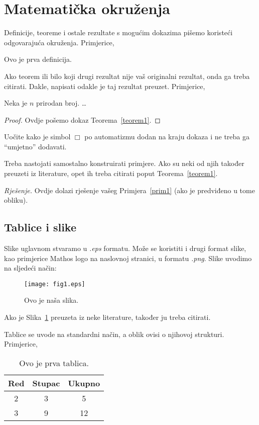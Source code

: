 \documentclass{mathos}
\begin{document}
\section{Matematička okruženja}

Definicije, teoreme i ostale rezultate s mogućim dokazima pišemo koristeći odgovarajuća okruženja. Primjerice,
\begin{defin}
Ovo je prva definicija.
\end{defin}
Ako teorem ili bilo koji drugi rezultat nije vaš originalni rezultat, onda ga treba citirati. Dakle, napisati odakle je taj rezultat preuzet. Primjerice,
\begin{teorem}  \label{teorem1}
Neka je $n$ prirodan broj. \dots
\end{teorem}

\begin{proof}
Ovdje pošemo dokaz Teorema~\ref{teorem1}.
\end{proof}
Uočite kako je simbol $\Box$ po automatizmu dodan na kraju dokaza i ne treba ga ``umjetno'' dodavati.

\begin{primjer}\label{prim1}
Treba nastojati samostalno konstruirati primjere. Ako su neki od njih također preuzeti iz literature, opet ih treba citirati poput Teorema~\ref{teorem1}.
\end{primjer}
\noindent
{\it Rješenje.} Ovdje dolazi rješenje vašeg Primjera~\ref{prim1} (ako je predviđeno u tome obliku).

\subsection{Tablice i slike}

Slike uglavnom stvaramo u {\it .eps} formatu. Može se koristiti i drugi format slike, kao primjerice  Mathos logo na naslovnoj stranici, u formatu {\it .png}. Slike uvodimo na sljedeći način:

\begin{figure}[h!]
\centering
\texttt{[image: fig1.eps]}
\caption{Ovo je naša slika.}
\label{fig1}
\end{figure}

Ako je Slika~\ref{fig1} preuzeta iz neke literature, također ju treba citirati.

\newpage
Tablice se uvode na standardni način, a oblik ovisi o njihovoj strukturi. Primjerice,

\begin{table}[hbtp]
\centering
\begin{tabular}{|c|c|c|}\hline
Red & Stupac& Ukupno\\\hline
2 & 3 & 5\\\hline
3 & 9 & 12\\\hline
\end{tabular}
\caption{Ovo je prva tablica.}
\label{table1}
\end{table}
\end{document}
